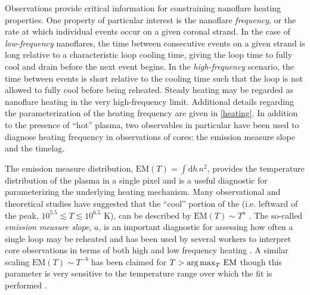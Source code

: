 Observations provide critical information for constraining nanoflare heating properties. One property of particular interest is the nanoflare \textit{frequency}, or the rate at which individual events occur on a given coronal strand. In the case of \textit{low-frequency} nanoflares, the time between consecutive events on a given strand is long relative to a characteristic loop cooling time, giving the loop time to fully cool and drain before the next event begins. In the \textit{high-frequency} scenario, the time between events is short relative to the cooling time such that the loop is not allowed to fully cool before being reheated. Steady heating may be regarded as nanoflare heating in the very high-frequency limit. Additional details regarding the parameterization of the heating frequency are given in \autoref{heating}. In addition to the presence of ``hot'' plasma, two observables in particular have been used to diagnose heating frequency in observations of \AR{} cores: the emission measure slope and the timelag. 

The emission measure distribution, $\mathrm{EM}(T)=\int\mathrm{d}h\,n^2$, provides the temperature distribution of the plasma in a single pixel and is a useful diagnostic for parameterizing the underlying heating mechanism. Many observational and theoretical studies have suggested that the ``cool'' portion of the \dem{} (i.e. leftward of the peak, $10^{5.5}\lesssim T\lesssim10^{6.5}$ K), can be described by $\mathrm{EM}(T)\sim T^a$ \citep{jordan_structure_1976,cargill_implications_1994,cargill_nanoflare_2004,warren_systematic_2012}. The so-called \textit{emission measure slope}, $a$, is an important diagnostic for assessing how often a single loop may be reheated and has been used by several workers to interpret \AR{} core observations in terms of both high and low frequency heating \citet[see Table 3 of][and references therin]{bradshaw_diagnosing_2012}. A similar scaling $\mathrm{EM}(T)\sim T^{-b}$ has been claimed for $T>\operatorname*{arg\,max}_T\,\mathrm{EM}$ though this parameter is very sensitive to the temperature range over which the fit is performed \citep[see section 3.3.1 of][]{barnes_inference_2016-1}.


